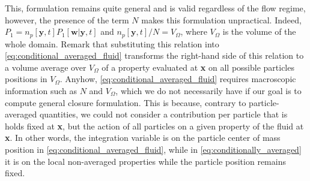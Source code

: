This, formulation remains quite general and is valid regardless of the flow regime, however, the presence of the term $N$ makes this formulation unpractical. 
Indeed, $P_1 = n_p[\textbf{y},t] P_1[\textbf{w}|\textbf{y},t]$ and $n_p[\textbf{y},t] /N = V_\Omega$, where $V_\Omega$ is the volume of the whole domain. 
Remark that substituting this relation into \ref{eq:conditional_averaged_fluid} transforms the right-hand side of this relation to a volume average over $V_\Omega$ of a property evaluated at \textbf{x} on all possible particles positions in $V_\Omega$.  
Anyhow, \ref{eq:conditional_averaged_fluid} requires macroscopic information such as $N$ and $V_\Omega$, which we do not necessarily have if our goal is to compute general closure formulation. 
This is because, contrary to particle-averaged quantities, we could not consider a contribution per particle that is holds fixed at \textbf{x}, but the action of all particles on a given property of the fluid at \textbf{x}.
In other words, the integration variable is on the particle center of mass position in \ref{eq:conditional_averaged_fluid}, while in \ref{eq:conditionally_averaged} it is on the local non-averaged properties while the particle position remains fixed. 


